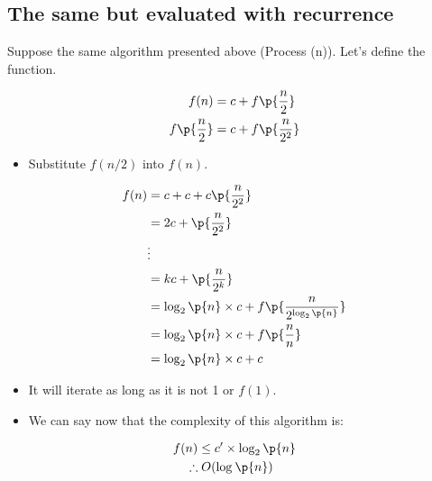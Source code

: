 \subsection{The same but evaluated with recurrence}
Suppose the same algorithm presented above (Process (n)). Let's define the function.
\begin{center}
   \begin{align*}
       f(n) &= c + f\p{\frac{n}{2}} \\ 
       f\p{\frac{n}{2}}  &= c + f\p{\frac{n}{2^2}}  \\ 
   \end{align*}
   \begin{itemize}
       \item Substitute $f(n/2)$ into $f(n)$.
   \end{itemize}
   \begin{align*}
        f(n) &= c + c + c \p{\frac{n}{2^2}}  \\ 
        &= 2c + \p{\frac{n}{2^2}}  \\ 
        &\vdots \\ 
        &= kc + \p{\frac{n}{2^k}}  \\ 
        &= \log_{2}\p{ n }\times c + f\p{\frac{n}{2^{\log_{2}\p{ n } }} }  \\ 
        &= \log_{2}\p{ n }\times c + f\p{\frac{n}{n}}  \\ 
        &= \log_{2}\p{ n }\times c + c \\ 
   \end{align*}
   \begin{itemize}
       \item It will iterate as long as it is not 1 or $f(1)$.
       \item We can say now that the complexity of this algorithm is: 
   \end{itemize}
   \begin{align*}
       f(n) &\leq c' \times \log_{2}\p{ n } \\ 
       \therefore &\; O(\log_{}\p{ n }) \\ 
   \end{align*}
\end{center}

